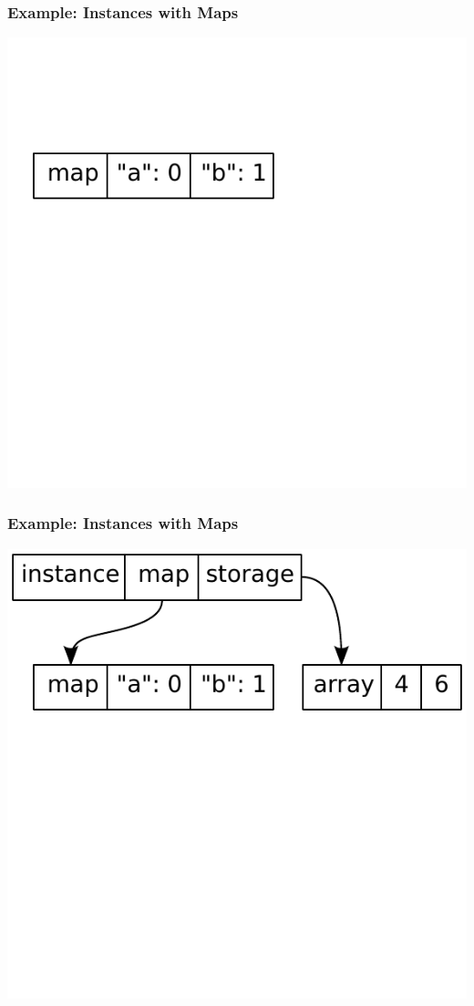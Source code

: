 \documentclass[utf8x]{beamer}
\begin{document}
\begin{frame}
  \frametitle{Example: Instances with Maps}
  \includegraphics[scale=0.7]{figures/map01.pdf}
\end{frame}

\begin{frame}
  \frametitle{Example: Instances with Maps}
  \includegraphics[scale=0.7]{figures/map02.pdf}
\end{frame}
\end{document}
